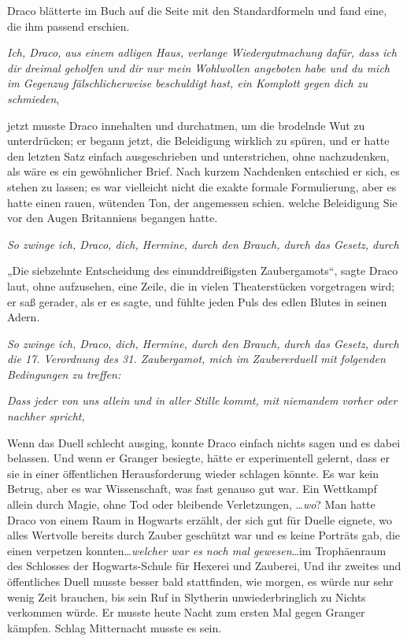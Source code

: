 {Draco blätterte im Buch auf die Seite mit den Standardformeln und fand eine, die ihm passend erschien.

\emph{Ich, Draco, aus einem adligen Haus, verlange Wiedergutmachung dafür, dass ich dir dreimal geholfen und dir nur mein Wohlwollen angeboten habe und du mich im Gegenzug fälschlicherweise beschuldigt hast, ein Komplott gegen dich zu schmieden},

jetzt musste Draco innehalten und durchatmen, um die brodelnde Wut zu unterdrücken; er begann jetzt, die Beleidigung wirklich zu spüren, und er hatte den letzten Satz einfach ausgeschrieben und unterstrichen, ohne nachzudenken, als wäre es ein gewöhnlicher Brief. Nach kurzem Nachdenken entschied er sich, es stehen zu lassen; es war vielleicht nicht die exakte formale Formulierung, aber es hatte einen rauen, wütenden Ton, der angemessen schien. welche Beleidigung Sie vor den Augen Britanniens begangen hatte.

\emph{So zwinge ich, Draco, dich, Hermine, durch den Brauch, durch das Gesetz, durch}

„Die siebzehnte Entscheidung des einunddreißigsten Zaubergamots“, sagte Draco laut, ohne aufzusehen, eine Zeile, die in vielen Theaterstücken vorgetragen wird; er saß gerader, als er es sagte, und fühlte jeden Puls des edlen Blutes in seinen Adern.

\emph{So zwinge ich, Draco, dich, Hermine, durch den Brauch, durch das Gesetz, durch die 17. Verordnung des 31. Zaubergamot, mich im Zaubererduell mit folgenden Bedingungen zu treffen:}

\emph{Dass jeder von uns allein und in aller Stille kommt, mit niemandem vorher oder nachher spricht,}

Wenn das Duell schlecht ausging, konnte Draco einfach nichts sagen und es dabei belassen. Und wenn er Granger besiegte, hätte er experimentell gelernt, dass er sie in einer öffentlichen Herausforderung wieder schlagen könnte. Es war kein Betrug, aber es war Wissenschaft, was fast genauso gut war. Ein Wettkampf allein durch Magie, ohne Tod oder bleibende Verletzungen, …\emph{wo}? Man hatte Draco von einem Raum in Hogwarts erzählt, der sich gut für Duelle eignete, wo alles Wertvolle bereits durch Zauber geschützt war und es keine Porträts gab, die einen verpetzen konnten…\emph{welcher war es noch mal gewesen}…im Trophäenraum des Schlosses der Hogwarts-Schule für Hexerei und Zauberei, Und ihr zweites und öffentliches Duell musste besser bald stattfinden, wie morgen, es würde nur sehr wenig Zeit brauchen, bis sein Ruf in Slytherin unwiederbringlich zu Nichts verkommen würde. Er musste heute Nacht zum ersten Mal gegen Granger kämpfen. Schlag Mitternacht musste es sein.

}
